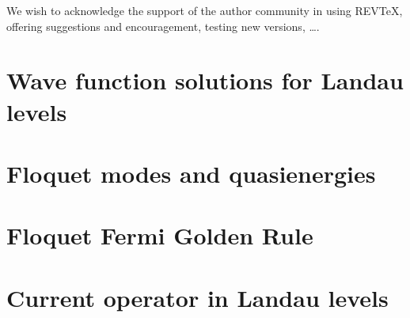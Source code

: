 \documentclass[%
 reprint,
 amsmath,amssymb,
 aps,
prb,
]{revtex4-2}
\begin{document}
\begin{acknowledgments}
We wish to acknowledge the support of the author community in using
REV\TeX{}, offering suggestions and encouragement, testing new versions,
\dots.
\end{acknowledgments}

\appendix

\section{Wave function solutions for Landau levels}


\section{Floquet modes and quasienergies}


\section{Floquet Fermi Golden Rule}


\section{Current operator in Landau levels}


\nocite{*}

\end{document}
